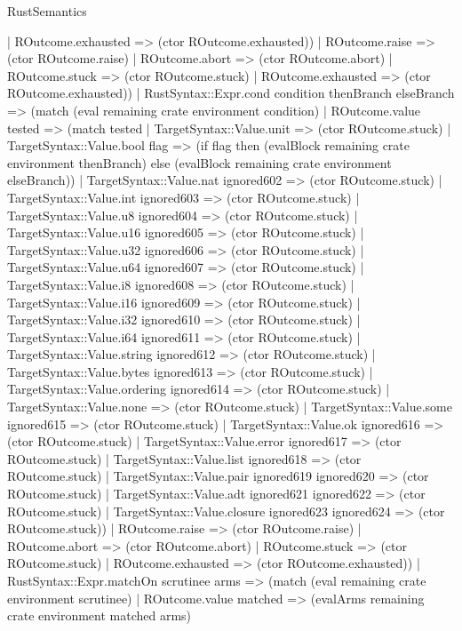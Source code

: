 \begin{lexlean}{RustSemantics}
\begin{semanticmodule}
{          | ROutcome.exhausted => (ctor ROutcome.exhausted))
        | ROutcome.raise => (ctor ROutcome.raise)
        | ROutcome.abort => (ctor ROutcome.abort)
        | ROutcome.stuck => (ctor ROutcome.stuck)
        | ROutcome.exhausted => (ctor ROutcome.exhausted))
      | RustSyntax::Expr.cond condition thenBranch elseBranch => (match (eval remaining crate environment condition)
        | ROutcome.value tested => (match tested
          | TargetSyntax::Value.unit => (ctor ROutcome.stuck)
          | TargetSyntax::Value.bool flag => (if flag then (evalBlock remaining crate environment thenBranch) else (evalBlock remaining crate environment elseBranch))
          | TargetSyntax::Value.nat ignored602 => (ctor ROutcome.stuck)
          | TargetSyntax::Value.int ignored603 => (ctor ROutcome.stuck)
          | TargetSyntax::Value.u8 ignored604 => (ctor ROutcome.stuck)
          | TargetSyntax::Value.u16 ignored605 => (ctor ROutcome.stuck)
          | TargetSyntax::Value.u32 ignored606 => (ctor ROutcome.stuck)
          | TargetSyntax::Value.u64 ignored607 => (ctor ROutcome.stuck)
          | TargetSyntax::Value.i8 ignored608 => (ctor ROutcome.stuck)
          | TargetSyntax::Value.i16 ignored609 => (ctor ROutcome.stuck)
          | TargetSyntax::Value.i32 ignored610 => (ctor ROutcome.stuck)
          | TargetSyntax::Value.i64 ignored611 => (ctor ROutcome.stuck)
          | TargetSyntax::Value.string ignored612 => (ctor ROutcome.stuck)
          | TargetSyntax::Value.bytes ignored613 => (ctor ROutcome.stuck)
          | TargetSyntax::Value.ordering ignored614 => (ctor ROutcome.stuck)
          | TargetSyntax::Value.none => (ctor ROutcome.stuck)
          | TargetSyntax::Value.some ignored615 => (ctor ROutcome.stuck)
          | TargetSyntax::Value.ok ignored616 => (ctor ROutcome.stuck)
          | TargetSyntax::Value.error ignored617 => (ctor ROutcome.stuck)
          | TargetSyntax::Value.list ignored618 => (ctor ROutcome.stuck)
          | TargetSyntax::Value.pair ignored619 ignored620 => (ctor ROutcome.stuck)
          | TargetSyntax::Value.adt ignored621 ignored622 => (ctor ROutcome.stuck)
          | TargetSyntax::Value.closure ignored623 ignored624 => (ctor ROutcome.stuck))
        | ROutcome.raise => (ctor ROutcome.raise)
        | ROutcome.abort => (ctor ROutcome.abort)
        | ROutcome.stuck => (ctor ROutcome.stuck)
        | ROutcome.exhausted => (ctor ROutcome.exhausted))
      | RustSyntax::Expr.matchOn scrutinee arms => (match (eval remaining crate environment scrutinee)
        | ROutcome.value matched => (evalArms remaining crate environment matched arms)
}
\end{semanticmodule}
\end{lexlean}
